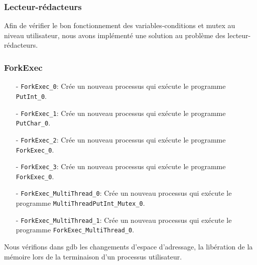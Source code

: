 \documentclass[11pt]{article}
\theoremstyle{definition}
\theoremstyle{definition}
\begin{document}
\subsubsection{Lecteur-rédacteurs}

Afin de vérifier le bon fonctionnement des variables-conditions et mutex
au niveau utilisateur, nous avons implémenté une solution au problème des
lecteur-rédacteurs.

\subsubsection{ForkExec}
\begin{itemize}
\item[-] \texttt{ForkExec\_0}: Crée un nouveau processus qui exécute le programme \texttt{PutInt\_0}.
\item[-] \texttt{ForkExec\_1}: Crée un nouveau processus qui exécute le programme \texttt{PutChar\_0}.
\item[-] \texttt{ForkExec\_2}: Crée un nouveau processus qui exécute le programme \texttt{ForkExec\_0}.
\item[-] \texttt{ForkExec\_3}: Crée un nouveau processus qui exécute le programme \texttt{ForkExec\_0}.
\item[-] \texttt{ForkExec\_MultiThread\_0}: Crée un nouveau processus qui exécute le programme \texttt{MultiThreadPutInt\_Mutex\_0}.
\item[-] \texttt{ForkExec\_MultiThread\_1}: Crée un nouveau processus qui exécute le programme \texttt{ForkExec\_MultiThread\_0}.
\end{itemize}
Nous vérifions dans gdb les changements d'espace d'adressage, la libération de la mémoire lors de la terminaison d'un processus utilisateur.
\end{document}
